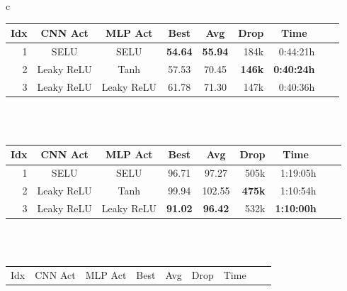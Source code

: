 \begin{table}[ht]
    \begin{center}
        \begin{tabular}{c}
            \begin{tabular}{rccccrrrr}
                \toprule
                \multicolumn{1}{c}{Idx} & \multicolumn{1}{c}{CNN Act} & \multicolumn{1}{c}{MLP Act} & \multicolumn{1}{c}{Best} & \multicolumn{1}{c}{Avg} & \multicolumn{1}{c}{Drop} & \multicolumn{1}{c}{Time}\\
                \midrule
                1 & SELU & SELU & \textbf{54.64} & \textbf{55.94} & 184k & 0:44:21h \\
                2 & Leaky ReLU & Tanh & 57.53 & 70.45 & \textbf{146k} & \textbf{0:40:24h} \\
                3 & Leaky ReLU & Leaky ReLU & 61.78 & 71.30 & 147k & 0:40:36h \\
                \bottomrule
            \end{tabular} \\
             \\
            \addlinespace[0.5cm]
            \begin{tabular}{rccccrrrr}
                \toprule
                \multicolumn{1}{c}{Idx} & \multicolumn{1}{c}{CNN Act} & \multicolumn{1}{c}{MLP Act} & \multicolumn{1}{c}{Best} & \multicolumn{1}{c}{Avg} & \multicolumn{1}{c}{Drop} & \multicolumn{1}{c}{Time}\\
                \midrule
                1 & SELU & SELU & 96.71 & 97.27 & 505k & 1:19:05h \\
                2 & Leaky ReLU & Tanh & 99.94 & 102.55 & \textbf{475k} & 1:10:54h \\
                3 & Leaky ReLU & Leaky ReLU & \textbf{91.02} & \textbf{96.42} & 532k & \textbf{1:10:00h} \\
                \bottomrule
            \end{tabular} \\
             \\
            \addlinespace[0.5cm]
            \begin{tabular}{rccccrrrr}
                \toprule
                \multicolumn{1}{c}{Idx} & \multicolumn{1}{c}{CNN Act} & \multicolumn{1}{c}{MLP Act} & \multicolumn{1}{c}{Best} & \multicolumn{1}{c}{Avg} & \multicolumn{1}{c}{Drop} & \multicolumn{1}{c}{Time}\\

\end{tabular}
\end{tabular}
\end{center}
\end{table}
